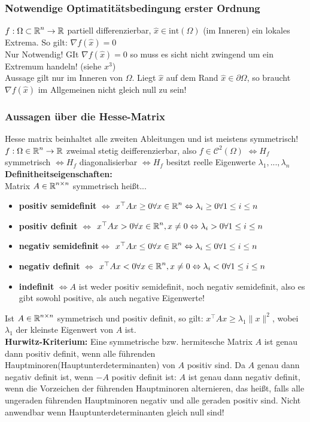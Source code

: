 \documentclass[german]{latex4ei/latex4ei_sheet}
\begin{document}
\subsubsection{Notwendige Optimatit\"atsbedingung erster Ordnung}
$f: \Omega \subset \operatorname{\mathbb R}^n \to \operatorname{\mathbb R}$ partiell differenzierbar, $\hat{x} \in \mathrm{int}(\Omega)$ (im Inneren) ein lokales Extrema. So gilt: $\nabla f(\hat{x})=0$\\
Nur Notwendig! GIt $\nabla f(\hat{x})=0$ so muss es sicht nicht zwingend um ein Extremum handeln! (siehe $x^3$)\\
Aussage gilt nur im Inneren von $\Omega$. Liegt $\hat{x}$ auf dem Rand $\hat{x} \in \partial \Omega$, so braucht $\nabla f(\hat{x})$ im Allgemeinen nicht gleich null zu sein!

\subsubsection{Aussagen \"uber die Hesse-Matrix}
Hesse matrix beinhaltet alle zweiten Ableitungen und ist meistens symmetrisch!\\
$f: \Omega \in \operatorname{\mathbb R}^n \to \operatorname{\mathbb R}$ zweimal stetig deifferenzierbar, also $f\in \mathcal{C}^2(\Omega)$ $\Leftrightarrow H_f$ symmetrisch $\Leftrightarrow H_f$ diagonalisierbar $\Leftrightarrow H_f$ besitzt reelle Eigenwerte $\lambda_1,...,\lambda_n$\\
\textbf{Definitheitseigenschaften:}\\
Matrix $A \in \operatorname{\mathbb R}^{n \times n}$ symmetrisch hei\ss{}t...
\begin{itemize}
\item \textbf{positiv semidefinit} $\Leftrightarrow$ $x^\top A x \ge 0 \forall x \in \operatorname{\mathbb R}^n \Leftrightarrow \lambda_i \ge 0 \forall 1 \le i \le n$
\item \textbf{positiv definit} $\Leftrightarrow$ $x^\top A x > 0 \forall x\in \operatorname{\mathbb R}^n, x \neq 0\Leftrightarrow \lambda_i > 0 \forall 1 \le i \le n$
\item \textbf{negativ semidefinit}$\Leftrightarrow$ $x^\top A x \le 0 \forall x \in \operatorname{\mathbb R}^n \Leftrightarrow \lambda_i \le 0 \forall 1 \le i \le n$
\item \textbf{negativ definit} $\Leftrightarrow$ $x^\top A x < 0 \forall x\in \operatorname{\mathbb R}^n, x \neq 0\Leftrightarrow \lambda_i < 0 \forall 1 \le i \le n$
\item \textbf{indefinit} $\Leftrightarrow A$ ist weder positiv semidefinit, noch negativ semidefinit, also es gibt sowohl positive, als auch negative Eigenwerte!
\end{itemize}  
Ist $A \in \operatorname{\mathbb R}^{n \times n}$ symmetrisch und positiv definit, so gilt: $x^\top A x \ge \lambda_1 \|x \|^2$, wobei $\lambda_1$ der kleinste Eigenwert von $A$ ist.\\
\textbf{Hurwitz-Kriterium:} Eine symmetrische bzw. hermitesche Matrix $A$ ist genau dann positiv definit, wenn alle führenden Hauptminoren(Hauptunterdeterminanten) von $A$ positiv sind. Da $A$ genau dann negativ definit ist, wenn $
-A$ positiv definit ist: $A$ ist genau dann negativ definit, wenn die Vorzeichen der führenden Hauptminoren alternieren, das heißt, falls alle ungeraden führenden Hauptminoren negativ und alle geraden positiv sind. Nicht anwendbar wenn Hauptunterdeterminanten gleich null sind!
\end{document}
